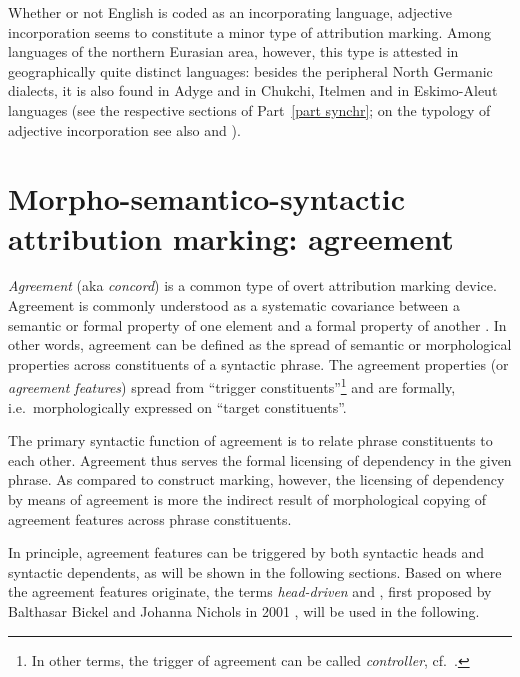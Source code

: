 Whether or not English is coded as an incorporating language, adjective incorporation seems to constitute a minor type of attribution marking. Among languages of the northern Eurasian area, however, this type is attested in geographically quite distinct languages: besides the peripheral North Germanic dialects, it is also found in Adyge and in Chukchi, Itelmen and in Eskimo-Aleut languages (see the respective sections of Part~\ref{part synchr}; on the typology of adjective incorporation see also \cite[225–236]{dahl2004a} and \cite[28–29]{dahl2015a}).

\section[Agreement marking]{Morpho-semantico-syntactic attribution marking: agreement}

\emph{Agreement} (aka \emph{concord}) is a common type of overt attribution marking device. Agreement is commonly understood as a systematic covariance between a semantic or formal property of one element and a formal property of another \cite[610]{steele1978}. In other words, agreement can be defined as the spread of semantic or morphological properties across constituents of a syntactic phrase. The agreement properties (or \emph{agreement features}) spread from “trigger constituents”\footnote{In other terms, the trigger of agreement can be called \emph{controller}, cf.~\citealt{corbett2006}.} and are formally, i.e.~morphologically expressed on “target constituents”.

The primary syntactic function of agreement is to relate phrase constituents to each other. Agreement thus serves the formal licensing of dependency in the given phrase. As compared to construct marking, however, the licensing of dependency by means of agreement is more the indirect result of morphological copying of agreement features across phrase constituents.

In principle, agreement features can be triggered by both syntactic heads and syntactic dependents, as will be shown in the following sections. Based on where the agreement features originate, the terms \emph{head\hyp{}driven} and \emph{}, first proposed by Balthasar Bickel and Johanna Nichols in 2001 \citep[published as][]{bickel-etal2007}, will be used in the following.

